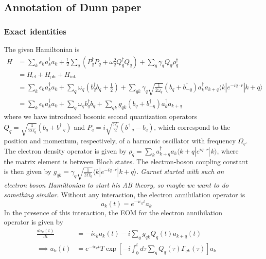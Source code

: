 \subsection{Annotation of Dunn paper}
\subsubsection{Exact identities}
The given Hamiltonian is 
\begin{align}
    H &= \sum_k \epsilon_k a_k^\dagger a_k + \frac{1}{2} \sum_q (P_q^\dagger P_q + \omega_q^2 Q_q^\dagger Q_q) + \sum_{q} \gamma_q Q_q \rho_q^\dagger \\
&= H_{\mathrm{el}} + H_{\mathrm{ph}} + H_{\mathrm{int}} \\
&= \sum_k \epsilon_k a_k^\dagger a_k + \sum_q \omega_q \left(b_q^\dagger b_q + \frac{1}{2}\right) + \sum_{qk} \gamma_q \sqrt{\frac{1}{2\omega_q}} (b_q + b_{-q}^\dagger) a_k^\dagger a_{k+q} \langle k | e^{-i q \cdot r} | k+q \rangle \\
&= \sum_k \epsilon_k a_k^\dagger a_k + \sum_q \omega_q b_q^\dagger b_q + \sum_{qk} g_{qk} (b_q + b_{-q}^\dagger) a_k^\dagger a_{k+q}
\end{align}
where we have introduced bosonic second quantization operators $Q_q= \sqrt{\frac{1}{2 \Omega_q}}\left(b_q+b_{-q}^{\dagger}\right)$ and $P_q=i \sqrt{\frac{\Omega_q}{2}}\left(b_{-q}^{\dagger}-b_q\right)$, which correspond to the position and momentum, respectively, of a harmonic oscillator with frequency $\Omega_q$. The electron density operator is given by $\rho_q=\sum_k a_{k+q}^{\dagger} a_k \langle k+q| e^{i q \cdot r}|k\rangle$, where the matrix element is between Bloch states. The electron-boson coupling constant is then given by $g_{q k}=\gamma_q \sqrt{\frac{1}{2 \Omega_q}}\langle k| e^{-i q \cdot r}|k+q\rangle$. \emph{Garnet started with such an electron boson Hamiltonian to start his AB theory, so maybe we want to do something similar.} Without any interaction, the electron annihilation operator is
\begin{equation}
    a_k(t) = e^{-i \epsilon_k t} a_k
\end{equation}
 In the presence of this interaction, the EOM for the electron annihilation operator is given by
\begin{align}
    \frac{d a_k(t)}{d t} &= -i \epsilon_k a_k(t) - i \sum_q g_{q k} Q_q(t) a_{k+q}(t) \\
\implies a_k(t) &= e^{-i \epsilon_k t} T \exp \left[-i \int_0^t d \tau \sum_q Q_q(\tau) \Gamma_{q k}(\tau)\right] a_k \\
\end{align} 
